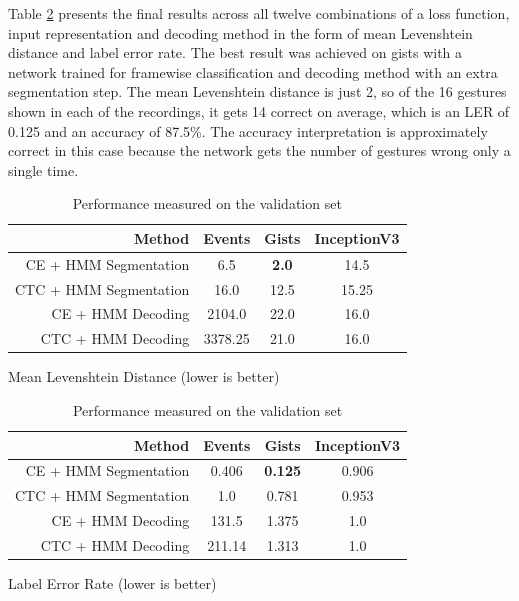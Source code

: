 Table \ref{tab:ler} presents the final results across all twelve combinations of
a loss function, input representation and decoding method in the form of mean
Levenshtein distance and label error rate. The best result was achieved on gists
with a network trained for framewise classification and decoding method with an
extra segmentation step. The mean Levenshtein distance is just 2, so of the 16
gestures shown in each of the recordings, it gets 14 correct on average, which
is an LER of 0.125 and an accuracy of 87.5\%. The accuracy interpretation is
approximately correct in this case because the network gets the number of
gestures wrong only a single time.

\begin{table}[h]
  \centering
  \begin{subtable}{\textwidth}
    \centering
    \begin{tabular}{r|c|c|c}
Method & Events & Gists & InceptionV3\\
\hline
CE + HMM Segmentation & 6.5 & \textbf{2.0} & 14.5\\
CTC + HMM Segmentation & 16.0 & 12.5 & 15.25\\
CE + HMM Decoding & 2104.0 & 22.0 & 16.0\\
CTC + HMM Decoding & 3378.25 & 21.0 & 16.0\\
    \end{tabular}
    \caption{Mean Levenshtein Distance (lower is better)}
  \end{subtable}
  \par\bigskip
  \begin{subtable}{\textwidth}
    \centering
    \begin{tabular}{r|c|c|c}
Method & Events & Gists & InceptionV3\\
\hline
CE + HMM Segmentation & 0.406 & \textbf{0.125} & 0.906\\
CTC + HMM Segmentation & 1.0 & 0.781 & 0.953\\
CE + HMM Decoding & 131.5 & 1.375 & 1.0\\
CTC + HMM Decoding & 211.14 & 1.313 & 1.0\\
    \end{tabular}
    \caption{Label Error Rate (lower is better)}
  \end{subtable}
  \caption{Performance measured on the validation set}
  \label{tab:ler}
\end{table}
